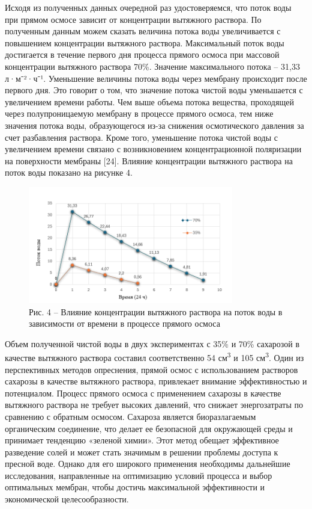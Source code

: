 Исходя из полученных данных очередной раз удостоверяемся, что поток воды
при прямом осмосе зависит от концентрации вытяжного раствора. По
полученным данным можем сказать величина потока воды увеличивается с
повышением концентрации вытяжного раствора. Максимальный поток воды
достигается в течение первого дня процесса прямого осмоса при массовой
концентрации вытяжного раствора 70\%. Значение максимального потока --
31,33 л·м⁻²·ч⁻¹. Уменьшение величины потока воды через мембрану
происходит после первого дня. Это говорит о том, что значение потока
чистой воды уменьшается с увеличением времени работы. Чем выше объема
потока вещества, проходящей через полупроницаемую мембрану в процессе
прямого осмоса, тем ниже значения потока воды, образующегося из-за
снижения осмотического давления за счет разбавления раствора. Кроме
того, уменьшение потока чистой воды с увеличением времени связано с
возникновением концентрационной поляризации на поверхности мембраны
{[}24{]}. Влияние концентрации вытяжного раствора на поток воды показано
на рисунке 4.

\begin{figure}[H]
	\centering
	\includegraphics[width=0.8\textwidth]{media/chem/image28}
	\caption*{Рис. 4 -- Влияние концентрации вытяжного раствора на поток воды
в зависимости от времени в процессе прямого осмоса}
\end{figure}

Объем полученной чистой воды в двух экспериментах с 35\% и 70\%
сахарозой в качестве вытяжного раствора составил соответственно 54
см\textsuperscript{3} и 105 см\textsuperscript{3}. Один из перспективных
методов опреснения, прямой осмос с использованием растворов сахарозы в
качестве вытяжного раствора, привлекает внимание эффективностью и
потенциалом. Процесс прямого осмоса с применением сахарозы в качестве
вытяжного раствора не требует высоких давлений, что снижает
энергозатраты по сравнению с обратным осмосом. Сахароза является
биоразлагаемым органическим соединение, что делает ее безопасной для
окружающей среды и принимает тенденцию «зеленой химии». Этот метод
обещает эффективное разведение солей и может стать значимым в решении
проблемы доступа к пресной воде. Однако для его широкого применения
необходимы дальнейшие исследования, направленные на оптимизацию условий
процесса и выбор оптимальных мембран, чтобы достичь максимальной
эффективности и экономической целесообразности.

